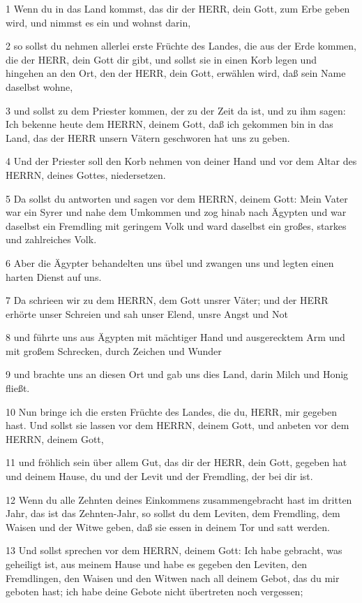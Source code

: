 \par 1 Wenn du in das Land kommst, das dir der HERR, dein Gott, zum Erbe geben wird, und nimmst es ein und wohnst darin,
\par 2 so sollst du nehmen allerlei erste Früchte des Landes, die aus der Erde kommen, die der HERR, dein Gott dir gibt, und sollst sie in einen Korb legen und hingehen an den Ort, den der HERR, dein Gott, erwählen wird, daß sein Name daselbst wohne,
\par 3 und sollst zu dem Priester kommen, der zu der Zeit da ist, und zu ihm sagen: Ich bekenne heute dem HERRN, deinem Gott, daß ich gekommen bin in das Land, das der HERR unsern Vätern geschworen hat uns zu geben.
\par 4 Und der Priester soll den Korb nehmen von deiner Hand und vor dem Altar des HERRN, deines Gottes, niedersetzen.
\par 5 Da sollst du antworten und sagen vor dem HERRN, deinem Gott: Mein Vater war ein Syrer und nahe dem Umkommen und zog hinab nach Ägypten und war daselbst ein Fremdling mit geringem Volk und ward daselbst ein großes, starkes und zahlreiches Volk.
\par 6 Aber die Ägypter behandelten uns übel und zwangen uns und legten einen harten Dienst auf uns.
\par 7 Da schrieen wir zu dem HERRN, dem Gott unsrer Väter; und der HERR erhörte unser Schreien und sah unser Elend, unsre Angst und Not
\par 8 und führte uns aus Ägypten mit mächtiger Hand und ausgerecktem Arm und mit großem Schrecken, durch Zeichen und Wunder
\par 9 und brachte uns an diesen Ort und gab uns dies Land, darin Milch und Honig fließt.
\par 10 Nun bringe ich die ersten Früchte des Landes, die du, HERR, mir gegeben hast. Und sollst sie lassen vor dem HERRN, deinem Gott, und anbeten vor dem HERRN, deinem Gott,
\par 11 und fröhlich sein über allem Gut, das dir der HERR, dein Gott, gegeben hat und deinem Hause, du und der Levit und der Fremdling, der bei dir ist.
\par 12 Wenn du alle Zehnten deines Einkommens zusammengebracht hast im dritten Jahr, das ist das Zehnten-Jahr, so sollst du dem Leviten, dem Fremdling, dem Waisen und der Witwe geben, daß sie essen in deinem Tor und satt werden.
\par 13 Und sollst sprechen vor dem HERRN, deinem Gott: Ich habe gebracht, was geheiligt ist, aus meinem Hause und habe es gegeben den Leviten, den Fremdlingen, den Waisen und den Witwen nach all deinem Gebot, das du mir geboten hast; ich habe deine Gebote nicht übertreten noch vergessen;
